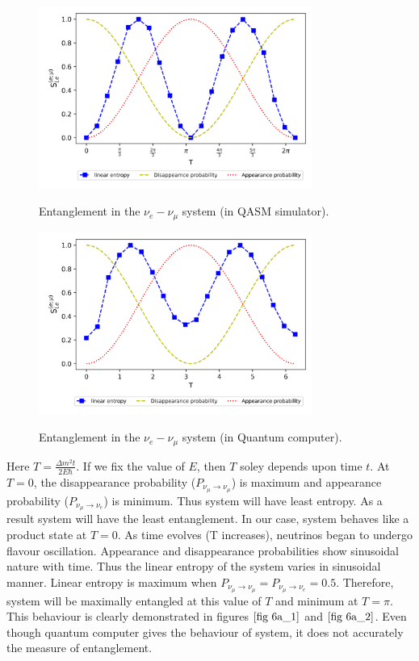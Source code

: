 \documentclass[12pt,a4paper]{report}
\begin{document}
\begin{figure}[H]
	\graphicspath{ {./Images/} }
	\centering	
	{\includegraphics[width=0.8\textwidth]{fig_6a_1.png}}
	\caption{Entanglement in the $\nu_{e}-\nu_{\mu}$ system (in QASM simulator).}
	\label{fig 6a_1}
\end{figure}
\begin{figure}[H]
	\graphicspath{ {./Images/} }
	\centering	
	{\includegraphics[width=0.8\textwidth]{fig_6a_2.png}}
	\caption{Entanglement in the $\nu_{e}-\nu_{\mu}$ system (in Quantum computer).}
	\label{fig 6a_2}
\end{figure}
\pagebreak
Here $T=\frac{\Delta m^{2}t}{2E\hbar}$. If we fix the value of $E$, then $T$ soley depends upon time $t$. At $T=0$, the disappearance probability ($P_{\nu_{\mu}\rightarrow\nu_{\mu}}$) is maximum and appearance probability ($P_{\nu_{\mu}\rightarrow\nu_{e}}$) is minimum. Thus system will have least entropy. As a result system will have the least entanglement. In our case, system behaves like a product state at $T=0$. As time evolves (T increases), neutrinos began to undergo flavour oscillation. Appearance and disappearance probabilities show sinusoidal nature with time. Thus the linear entropy of the system varies in sinusoidal manner. Linear entropy is maximum when $P_{\nu_{\mu}\rightarrow\nu_{\mu}}=P_{\nu_{\mu}\rightarrow\nu_{e}}=0.5$. Therefore, system will be maximally entangled at this value of $T$ and minimum at $T=\pi$. This behaviour is clearly demonstrated in figures $\ref{fig 6a_1}$ and $\ref{fig 6a_2}$. Even though quantum computer gives the behaviour of system, it does not accurately the measure of entanglement.
\end{document}
